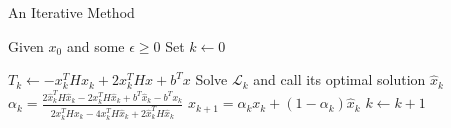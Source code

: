 \begin{algorithm}[ht!]
\caption{An Iterative Method}
\label{alg:iter}
\DontPrintSemicolon
Given $x_0$ and some $\epsilon \ge 0$\;
Set $k \leftarrow 0$\;

 {
    $T_k \leftarrow - x_k^THx_k + 2x_k^THx + b^Tx$\;
    Solve $\mathcal{L}_k$ and call its optimal solution $\hat{x}_k$\;
    $\alpha_k = \displaystyle
                \frac{
                      2\hat{x}_k^T H \hat{x}_k
                    - 2x_k^T H \hat{x}_k
                    + b^T \hat{x}_k
                    - b^T x_k
                     }{
                      2x_k^THx_k
                    - 4x_k^TH\hat{x}_k
                    + 2\hat{x}_k^T H \hat{x}_k
                     }$\;
    $x_{k+1} = \alpha_k x_k + (1-\alpha_k)\hat{x}_k$\;
    $k \leftarrow k +1$\;
}
\end{algorithm}
